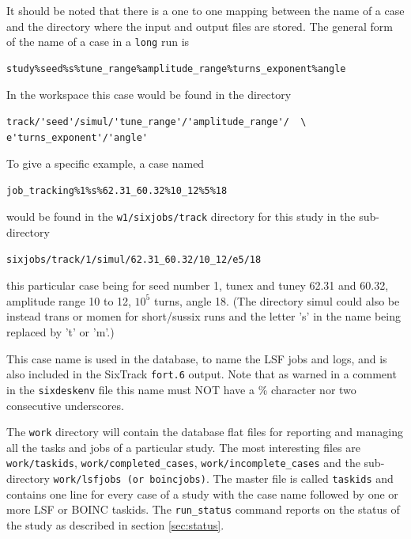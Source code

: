 \documentclass{cernatsnote}    %
\begin{document}
It should be noted that there is a one to one mapping between the name of a case
and the directory where the input and output files are stored. The general form of
the name of a case in a {\tt long} run is 
\begin{verbatim}
study%seed%s%tune_range%amplitude_range%turns_exponent%angle
\end{verbatim}
In the workspace this case would be found in the directory
\begin{verbatim}
track/'seed'/simul/'tune_range'/'amplitude_range'/  \
e'turns_exponent'/'angle'
\end{verbatim}
To give a specific example, a case named
\begin{verbatim}
job_tracking%1%s%62.31_60.32%10_12%5%18
\end{verbatim} would be found in the {\tt w1/sixjobs/track} directory for 
this study in the sub-directory
\begin{verbatim}
sixjobs/track/1/simul/62.31_60.32/10_12/e5/18
\end{verbatim}
this particular case being for seed number 1, tunex and tuney 62.31 and 60.32,
amplitude range 10 to 12, $10^5$ turns, angle 18. (The directory simul could also
be instead trans or momen for short/sussix runs and the letter 's' in the
name being replaced by 't' or 'm'.)
 
This case name is used in the database, to name the LSF jobs and logs, and is
also included in the SixTrack {\tt fort.6} output. Note that as warned in a
comment in the {\tt sixdeskenv} file this name must
NOT have a \% character nor two consecutive underscores.

The {\tt work} directory will contain the database flat files for reporting
and managing all the tasks and jobs of a particular study.
The most interesting files are {\tt work/taskids}, {\tt work/completed\_cases},
{\tt work/incomplete\_cases} and the sub-directory {\tt work/lsfjobs (or boincjobs)}.
The master file is called {\tt taskids} and contains one line for every case of
a study with the case name followed by one or more LSF or BOINC taskids. The {\tt run\_status}
command reports on the status of the study as described in section \ref{sec:status}.
\end{document}
